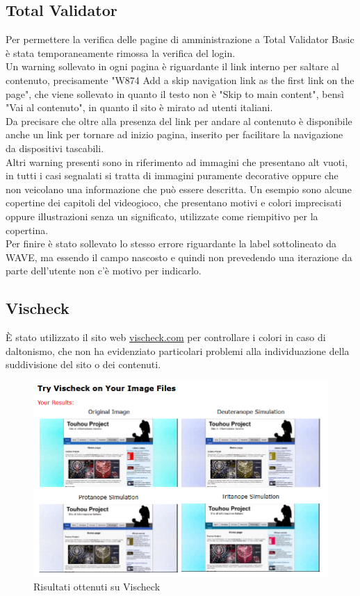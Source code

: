 \documentclass[openany, a4paper, 12pt]{report}
\begin{document}
			\subsection{Total Validator}
				Per permettere la verifica delle pagine di amministrazione a Total Validator Basic è stata temporaneamente rimossa la verifica del login.\\
				Un warning sollevato in ogni pagina è riguardante il link interno per saltare al contenuto, precisamente "W874 Add a skip navigation link as the first link on the page", che viene sollevato in quanto il testo non è "Skip to main content", bensì "Vai al contenuto", in quanto il sito è mirato ad utenti italiani.\\
				Da precisare che oltre alla presenza del link per andare al contenuto è disponibile anche un link per tornare ad inizio pagina, inserito per facilitare la navigazione da dispositivi tascabili.\\
				Altri warning presenti sono in riferimento ad immagini che presentano alt vuoti, in tutti i casi segnalati si tratta di immagini puramente decorative oppure che non veicolano una informazione che può essere descritta. Un esempio sono alcune copertine dei capitoli del videogioco, che presentano motivi e colori imprecisati oppure illustrazioni senza un  significato, utilizzate come riempitivo per la copertina.\\
				Per finire è stato sollevato lo stesso errore riguardante la label sottolineato da WAVE, ma essendo il campo nascosto e quindi non prevedendo una iterazione da parte dell'utente non c'è motivo per indicarlo.\\

			\subsection{Vischeck}
			\`{E} stato utilizzato il sito web \url{vischeck.com} per controllare i colori in caso di daltonismo, che non ha evidenziato particolari problemi alla individuazione della suddivisione del sito o dei contenuti.
			
			\begin{figure}[H]
				\centering
				\includegraphics[width=0.8\linewidth]{images/daltonismo}
				\caption{Risultati ottenuti su Vischeck}
			\end{figure}
			
\end{document}
